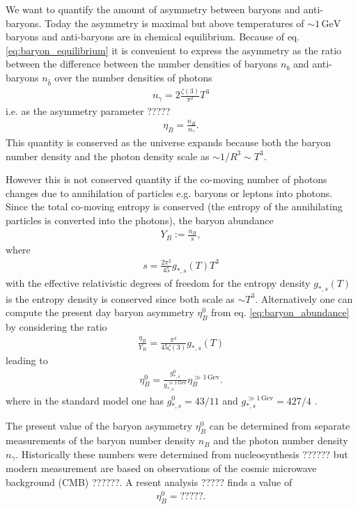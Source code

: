 \documentclass[13pt,a4paper,twoside,titlepage]{article}
\begin{document}
We want to quantify the amount of asymmetry between baryons and anti-baryons.
Today the asymmetry is maximal but
above temperatures of $\sim 1 \, \mathrm{GeV}$ baryons and anti-baryons are in chemical equilibrium.
Because of eq. \eqref{eq:baryon_equilibrium} it is convenient to express the asymmetry as
the ratio between the difference between the number densities of baryons $n_b$ and anti-baryons $n_{\hat{b}}$
over the number densities of photons \cite[eq. 3.52]{the_early_universe_kolb_and_turner}
\begin{align}
    n_\gamma = 2 \frac{\zeta(3)}{\pi^2} T^3
\end{align}
i.e. as the asymmetry parameter ?????
\begin{align}
    \eta_B = \frac{n_B}{n_\gamma}.
\end{align}
This quantity is conserved as the universe expands because both the baryon number density
and the photon density scale as $\sim 1/R^3 \sim T^3$.

However this is not conserved quantity if the co-moving number of photons changes due to annihilation
of particles e.g. baryons or leptons into photons.
Since the total co-moving entropy is conserved (the entropy of the annihilating particles is converted into the photons), the baryon abundance
\begin{align}
    \label{eq:baryon_abundance}
    Y_B := \frac{n_B}{s},
\end{align}
where
\begin{align}
    s = \frac{2 \pi^2}{45} g_{*, s}(T) T^3
\end{align}
with the effective relativistic degrees of freedom for the entropy density $g_{*, s}(T)$
is the entropy density
is conserved since both scale as $\sim T^3$.
Alternatively one can compute the present day baryon asymmetry $\eta_B^0$ from eq. \eqref{eq:baryon_abundance} by considering the ratio
\begin{align}
    \frac{\eta_B}{Y_B} = \frac{\pi^4}{45 \zeta(3)} g_{*, s}(T)
\end{align}
leading to
\begin{align}
    \label{eq:asymmetry_redshift}
    \eta_B^0 = \frac{g_{*,s}^0}{g_{*, s}^{\gg 1 \, \mathrm{Gev}}} \eta_B^{\gg 1 \, \mathrm{Gev}}.
\end{align}
where in the standard model one has $g_{*,s}^0 = 43/11$ and $g_{*, s}^{\gg 1 \, \mathrm{Gev}} = 427/4$ \cite[sec. 3.4]{the_early_universe_kolb_and_turner}.

The present value of the baryon asymmetry $\eta_B^0$ can be determined from separate measurements
of the baryon number density $n_B$ and the photon number density $n_\gamma$.
Historically these numbers were determined from nucleosynthesis ?????? but modern measurement are based on observations of the cosmic microwave background (CMB) ??????.
A resent analysis ????? finds a value of
\begin{align}
    \eta_B^0 = ?????.
\end{align}
\end{document}
